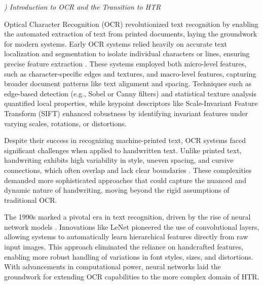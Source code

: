\documentclass[conference]{IEEEtran}
\newcounter{customsubsubsection} %
\renewcommand{\subsubsection}[1]{%
  \stepcounter{customsubsubsection}%
  \vspace{0.5em} %
  \textit{\arabic{customsubsubsection}) #1}%
  \vspace{0.5em} %
}
\begin{document}
\subsubsection{Introduction to OCR and the Transition to HTR}




Optical Character Recognition (OCR) revolutionized text recognition by enabling the automated extraction of text from printed documents, laying the groundwork for modern systems. Early OCR systems relied heavily on accurate text localization and segmentation to isolate individual characters or lines, ensuring precise feature extraction \cite{steinherz1999comprehensive, casey1996survey}. These systems employed both micro-level features, such as character-specific edges and textures, and macro-level features, capturing broader document patterns like text alignment and spacing. Techniques such as edge-based detection (e.g., Sobel or Canny filters) \cite{canny1986computational} and statistical texture analysis quantified local properties, while keypoint descriptors like Scale-Invariant Feature Transform (SIFT) \cite{lowe2004distinctive} enhanced robustness by identifying invariant features under varying scales, rotations, or distortions.


Despite their success in recognizing machine-printed text, OCR systems faced significant challenges when applied to handwritten text. Unlike printed text, handwriting exhibits high variability in style, uneven spacing, and cursive connections, which often overlap and lack clear boundaries \cite{plamondon2000online, steinherz1999comprehensive}. These complexities demanded more sophisticated approaches that could capture the nuanced and dynamic nature of handwriting, moving beyond the rigid assumptions of traditional OCR.

The 1990s marked a pivotal era in text recognition, driven by the rise of neural network models \cite{parvez2013offline}. Innovations like LeNet \cite{lecun1998gradient} pioneered the use of convolutional layers, allowing systems to automatically learn hierarchical features directly from raw input images. This approach eliminated the reliance on handcrafted features, enabling more robust handling of variations in font styles, sizes, and distortions. With advancements in computational power, neural networks laid the groundwork for extending OCR capabilities to the more complex domain of HTR.
\end{document}
